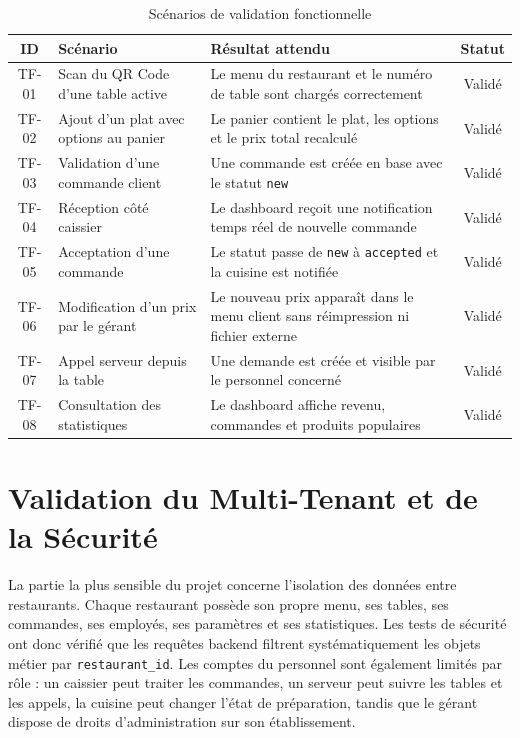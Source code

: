 \documentclass[12pt,a4paper]{report}
\begin{document}
\begin{table}[H]
    \centering
    \begin{tabularx}{\textwidth}{c X X c}
        \toprule
        \rowcolor{primary!10}
        \textbf{ID} & \textbf{Scénario} & \textbf{Résultat attendu} & \textbf{Statut} \\
        \midrule
        TF-01 & Scan du QR Code d'une table active & Le menu du restaurant et le numéro de table sont chargés correctement & Validé \\
        TF-02 & Ajout d'un plat avec options au panier & Le panier contient le plat, les options et le prix total recalculé & Validé \\
        TF-03 & Validation d'une commande client & Une commande est créée en base avec le statut \texttt{new} & Validé \\
        TF-04 & Réception côté caissier & Le dashboard reçoit une notification temps réel de nouvelle commande & Validé \\
        TF-05 & Acceptation d'une commande & Le statut passe de \texttt{new} à \texttt{accepted} et la cuisine est notifiée & Validé \\
        TF-06 & Modification d'un prix par le gérant & Le nouveau prix apparaît dans le menu client sans réimpression ni fichier externe & Validé \\
        TF-07 & Appel serveur depuis la table & Une demande est créée et visible par le personnel concerné & Validé \\
        TF-08 & Consultation des statistiques & Le dashboard affiche revenu, commandes et produits populaires & Validé \\
        \bottomrule
    \end{tabularx}
    \caption{Scénarios de validation fonctionnelle}
    \label{tab:functional-tests}
\end{table}

\section{Validation du Multi-Tenant et de la Sécurité}

La partie la plus sensible du projet concerne l'isolation des données entre restaurants. Chaque restaurant possède son propre menu, ses tables, ses commandes, ses employés, ses paramètres et ses statistiques. Les tests de sécurité ont donc vérifié que les requêtes backend filtrent systématiquement les objets métier par \texttt{restaurant\_id}. Les comptes du personnel sont également limités par rôle : un caissier peut traiter les commandes, un serveur peut suivre les tables et les appels, la cuisine peut changer l'état de préparation, tandis que le gérant dispose de droits d'administration sur son établissement.
\end{document}
